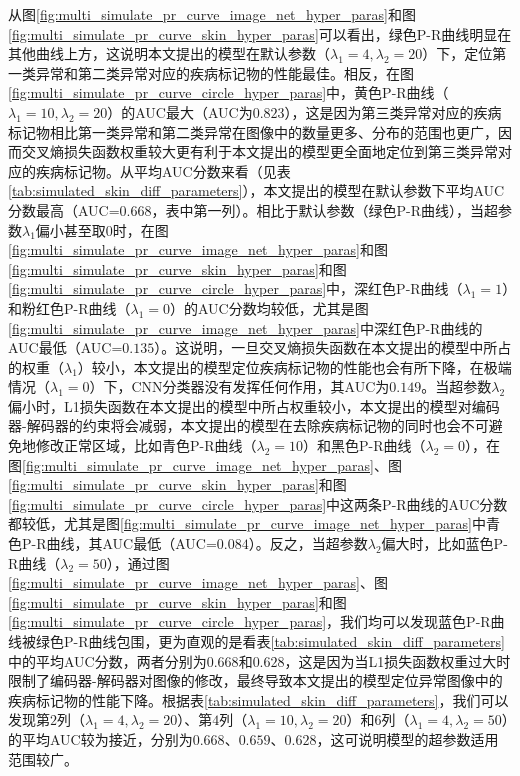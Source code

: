 从图\ref{fig:multi_simulate_pr_curve_image_net_hyper_paras}和图\ref{fig:multi_simulate_pr_curve_skin_hyper_paras}可以看出，绿色P-R曲线明显在其他曲线上方，这说明本文提出的模型在默认参数（$\lambda_{1}=4,\lambda_{2}=20$）下，定位第一类异常和第二类异常对应的疾病标记物的性能最佳。相反，在图\ref{fig:multi_simulate_pr_curve_circle_hyper_paras}中，黄色P-R曲线（$\lambda_{1}=10,\lambda_{2}=20$）的AUC最大（AUC为$0.823$），这是因为第三类异常对应的疾病标记物相比第一类异常和第二类异常在图像中的数量更多、分布的范围也更广，因而交叉熵损失函数权重较大更有利于本文提出的模型更全面地定位到第三类异常对应的疾病标记物。从平均AUC分数来看（见表\ref{tab:simulated_skin_diff_parameters}），本文提出的模型在默认参数下平均AUC分数最高（AUC=$0.668$，表中第一列）。相比于默认参数（绿色P-R曲线），当超参数$\lambda_{1}$偏小甚至取$0$时，在图\ref{fig:multi_simulate_pr_curve_image_net_hyper_paras}和图\ref{fig:multi_simulate_pr_curve_skin_hyper_paras}和图\ref{fig:multi_simulate_pr_curve_circle_hyper_paras}中，深红色P-R曲线（$\lambda_{1}=1$）和粉红色P-R曲线（$\lambda_{1}=0$）的AUC分数均较低，尤其是图\ref{fig:multi_simulate_pr_curve_image_net_hyper_paras}中深红色P-R曲线的AUC最低（AUC=$0.135$）。这说明，一旦交叉熵损失函数在本文提出的模型中所占的权重（$\lambda_{1}$）较小，本文提出的模型定位疾病标记物的性能也会有所下降，在极端情况（$\lambda_{1}=0$）下，CNN分类器没有发挥任何作用，其AUC为$0.149$。当超参数$\lambda_{2}$偏小时，L1损失函数在本文提出的模型中所占权重较小，本文提出的模型对编码器-解码器的约束将会减弱，本文提出的模型在去除疾病标记物的同时也会不可避免地修改正常区域，比如青色P-R曲线（$\lambda_{2}=10$）和黑色P-R曲线（$\lambda_2=0$），在图\ref{fig:multi_simulate_pr_curve_image_net_hyper_paras}、图\ref{fig:multi_simulate_pr_curve_skin_hyper_paras}和图\ref{fig:multi_simulate_pr_curve_circle_hyper_paras}中这两条P-R曲线的AUC分数都较低，尤其是图\ref{fig:multi_simulate_pr_curve_image_net_hyper_paras}中青色P-R曲线，其AUC最低（AUC=$0.084$）。反之，当超参数$\lambda_{2}$偏大时，比如蓝色P-R曲线（$\lambda_{2}=50$），通过图\ref{fig:multi_simulate_pr_curve_image_net_hyper_paras}、图\ref{fig:multi_simulate_pr_curve_skin_hyper_paras}和图\ref{fig:multi_simulate_pr_curve_circle_hyper_paras}，我们均可以发现蓝色P-R曲线被绿色P-R曲线包围，更为直观的是看表\ref{tab:simulated_skin_diff_parameters}中的平均AUC分数，两者分别为$0.668$和$0.628$，这是因为当L1损失函数权重过大时限制了编码器-解码器对图像的修改，最终导致本文提出的模型定位异常图像中的疾病标记物的性能下降。根据表\ref{tab:simulated_skin_diff_parameters}，我们可以发现第$2$列（$\lambda_{1}=4,\lambda_{2}=20$）、第$4$列（$\lambda_{1}=10,\lambda_{2}=20$）和$6$列（$\lambda_{1}=4,\lambda_{2}=50$）的平均AUC较为接近，分别为$0.668$、$0.659$、$0.628$，这可说明模型的超参数适用范围较广。

